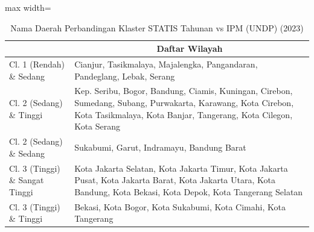 \begin{table}[H]
\centering
\caption{Nama Daerah Perbandingan Klaster STATIS Tahunan vs IPM (UNDP) (2023)} \label{tab:app1statis_ipm_name_2023}
\begin{adjustbox}{max width=\textwidth}
\begin{tabular}{|>{\centering\arraybackslash}p{4cm}|p{10cm}|}
\hline
\multicolumn{1}{|c|}{\textbf{Kategori}} & \multicolumn{1}{c|}{\textbf{Daftar Wilayah}} \\
\hline
Cl. 1 (Rendah) \& Sedang & Cianjur, Tasikmalaya, Majalengka, Pangandaran, Pandeglang, Lebak, Serang \\
\hline
Cl. 2 (Sedang) \& Tinggi & Kep. Seribu, Bogor, Bandung, Ciamis, Kuningan, Cirebon, Sumedang, Subang, Purwakarta, Karawang, Kota Cirebon, Kota Tasikmalaya, Kota Banjar, Tangerang, Kota Cilegon, Kota Serang \\
\hline
Cl. 2 (Sedang) \& Sedang & Sukabumi, Garut, Indramayu, Bandung Barat \\
\hline
Cl. 3 (Tinggi) \& Sangat Tinggi & Kota Jakarta Selatan, Kota Jakarta Timur, Kota Jakarta Pusat, Kota Jakarta Barat, Kota Jakarta Utara, Kota Bandung, Kota Bekasi, Kota Depok, Kota Tangerang Selatan \\
\hline
Cl. 3 (Tinggi) \& Tinggi & Bekasi, Kota Bogor, Kota Sukabumi, Kota Cimahi, Kota Tangerang \\
\hline
\end{tabular}
\end{adjustbox}
\end{table}